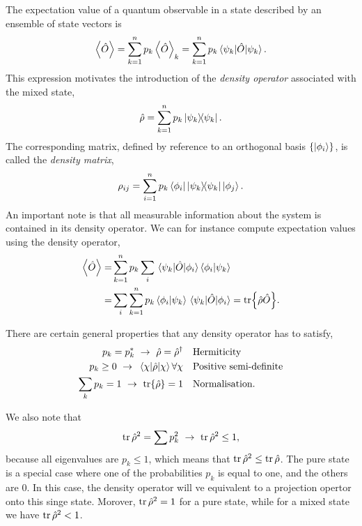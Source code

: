     The expectation value of a quantum observable in a state described by an ensemble of state
    vectors is 
    \begin{equation}
        \ev{\hat{O}} = \sum_{k=1}^n p_k \ev{\hat{O}}_k = \sum_{k=1}^n p_k \mel{\psi_k}{\hat{O}}{\psi_k}.
    \end{equation}
    This expression motivates the introduction of the \emph{density operator} associated with 
    the mixed state,
    \begin{equation}
        \hat{\rho} = \sum_{k=1}^n p_k \dyad{\psi_k}.
    \end{equation}
    The corresponding matrix, defined by reference to an orthogonal basis $\{\ket{\phi_i}\}$,
    is called the \emph{density matrix},
    \begin{equation}
        \rho_{ij} = \sum_{i=1}^n p_k \bra{\phi_i}\dyad{\psi_k}\ket{\phi_j}.
    \end{equation}
    An important note is that all measurable information about the system is contained in its 
    density operator. We can for instance compute expectation values using the density operator,
    \begin{equation}
        \begin{aligned}
        \ev{\hat{O}}
            =& \sum_{k=1}^n p_k \sum_i \mel{\psi_k}{\hat{O}}{\phi_i} \braket{\phi_i}{\psi_k} \\
            =& \sum_i \sum_{k=1}^n p_k \braket{\phi_i}{\psi_k} \mel{\psi_k}{\hat{O}}{\phi_i}
            = \tr{\hat{\rho}\hat{O}}.
        \end{aligned}
    \end{equation}
    
    There are certain general properties that any density operator has to satisfy,
    \begin{equation}
        \begin{aligned}
        p_k = p_k^*\ \to\ \hat{\rho}=\hat{\rho}^\dagger &\quad
            \text{Hermiticity} \\
        p_k \geq 0\ \to\ \mel{\chi}{\hat{\rho}}{\chi} \forall \chi &\quad 
            \text{Positive semi-definite} \\
        \sum_k p_k = 1\ \to \ \tr{\hat{\rho}} = 1 &\quad 
            \text{Normalisation}.
        \end{aligned}
    \end{equation}     

    We also note that
    \begin{equation}
        \tr \hat{\rho}^2 = \sum p_k^2 \ \to \ \tr \hat{\rho}^2 \leq 1,
    \end{equation}
    because all eigenvalues are $p_k \leq 1$, which means that $\tr \hat{\rho}^2 \leq \tr \hat{\rho}$.
    The pure state is a special case where one of the probabilities $p_k$ is equal to one, and the others 
    are $0$. In this case, the density operator will ve equivalent to a projection opertor onto this singe 
    state. Morover, $\tr\hat{\rho}^2 = 1$ for a pure state, while for a mixed state we have 
    $\tr\hat{\rho}^2 <1$.